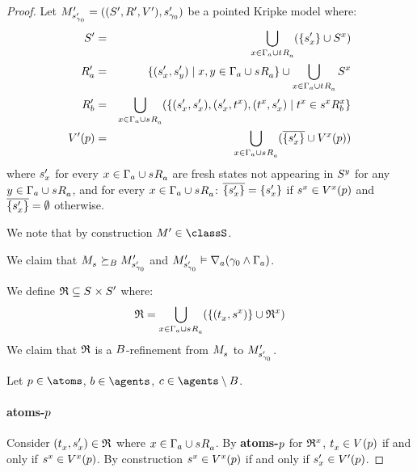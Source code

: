 \begin{proof}
Let $\kPModelAndTupleP{\kStateSP_{\gamma_0}}$ be a pointed Kripke model where:
\begin{eqnarray*}
    \kStatesP &=& \bigcup_{x \in \Gamma_\agentA \cup \kSuccessorsA{\kStateT}} (\{\kStateSP_x\} \cup \kStates[x])\\
    \kAccessibilityPA &=& \{(\kStateSP_x, \kStateSP_y) \mid x, y \in \Gamma_\agentA \cup \kSuccessorsA{\kStateS}\} \cup \bigcup_{x \in \Gamma_\agentA \cup \kSuccessorsA{\kStateT}} \kStates[x]\\
    \kAccessibilityPB &=& \bigcup_{x \in \Gamma_\agentA \cup \kSuccessorsA{\kStateS}} (\{(\kStateSP_x, \kStateSP_x), (\kStateSP_x, \kStateT[x]), (\kStateT[x], \kStateSP_x) \mid \kStateT[x] \in \kSuccessorsB[x]{\kStateS[x]}\}\\
    \kValuationP(\atomP) &=& \bigcup_{x \in \Gamma_\agentA \cup \kSuccessorsA{\kStateS}} (\overline{\{\kStateSP_x\}} \cup \kValuation[x](\atomP))
\end{eqnarray*}
where $\kStateSP_x$ for every $x \in \Gamma_\agentA \cup \kSuccessorsA{\kStateS}$ are fresh states not appearing in $\kStates[y]$ for any $y \in \Gamma_\agentA \cup \kSuccessorsA{\kStateS}$, and for every $x \in \Gamma_\agentA \cup \kSuccessorsA{\kStateS}$: $\overline{\{\kStateSP_x\}} = \{\kStateSP_x\}$ if $\kStateS[x] \in \kValuation[x](\atomP)$ and $\overline{\{\kStateSP_x\}} = \emptyset$ otherwise.

We note that by construction $\kModelP \in \classS$.

We claim that $\kPModel{\kStateS} \simulatesBs \kPModelP{\kStateSP_{\gamma_0}}$ and $\kPModelP{\kStateSP_{\gamma_0}} \entails \coversA (\gamma_0 \land \Gamma_\agentA)$.

We define $\refinement \subseteq \kStates \times \kStatesP$ where:
$$
\refinement = \bigcup_{x \in \Gamma_\agentA \cup \kSuccessorsA{\kStateS}} (\{(\kStateT_x, \kStateS[x])\} \cup \refinement^x)
$$
We claim that $\refinement$ is a $\agentsB$-refinement from $\kPModel{\kStateS}$ to $\kPModelP{\kStateSP_{\gamma_0}}$.

Let $\atomP \in \atoms$, $\agentB \in \agents$, $\agentC \in \agents \setminus \agentsB$.

\paragraph{atoms-$\atomP$}
Consider $(\kStateT_x, \kStateSP_x) \in \refinement$ where $x \in \Gamma_\agentA \cup \kSuccessorsA{\kStateS}$.
By {\bf atoms-$\atomP$} for $\refinement^x$, $\kStateT_x \in \kValuation(\atomP)$ if and only if $\kStateS[x] \in \kValuation[x](\atomP)$.
By construction $\kStateS[x] \in \kValuation[x](\atomP)$ if and only if $\kStateSP_x \in \kValuationP(\atomP)$.


\end{proof}
